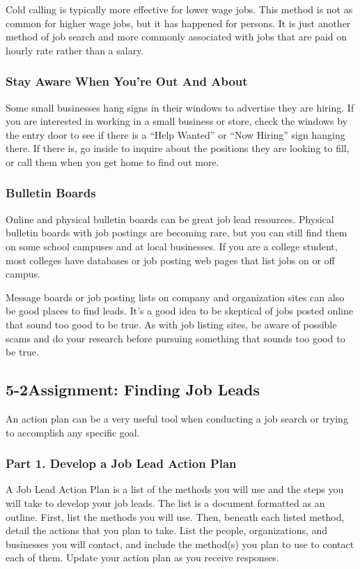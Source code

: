 Cold calling is typically more effective for lower wage jobs. This method is not as common for higher wage jobs, but it has happened for persons. It is just another method of job search and more commonly associated with jobs that are paid on hourly rate rather than a salary.

\subsubsection*{Stay Aware When You're Out And About}

Some small businesses hang signs in their windows to advertise they are hiring. If you are interested in working in a small business or store, check the windows by the entry door to see if there is a ``Help Wanted'' or ``Now Hiring'' sign hanging there. If there is, go inside to inquire about the positions they are looking to fill, or call them when you get home to find out more.

\subsubsection*{Bulletin Boards}

Online and physical bulletin boards can be great job lead resources. Physical bulletin boards with job postings are becoming rare, but you can still find them on some school campuses and at local businesses. If you are a college student, most colleges have databases or job posting web pages that list jobs on or off campus.

Message boards or job posting lists on company and organization sites can also be good places to find leads. It's a good idea to be skeptical of jobs posted online that sound too good to be true. As with job listing sites, be aware of possible scams and do your research before pursuing something that sounds too good to be true.

\pagebreak \subsection*{5-2\quad Assignment: Finding Job Leads}
An action plan can be a very useful tool when conducting a job search or trying to accomplish any specific goal.

\subsubsection*{Part 1. Develop a Job Lead Action Plan}
A Job Lead Action Plan is a list of the methods you will use and the steps you will take to develop your job leads. The list is a document formatted as an outline. First, list the methods you will use. Then, beneath each listed method, detail the actions that you plan to take. List the people, organizations, and businesses you will contact, and include the method(s) you plan to use to contact each of them. Update your action plan as you receive responses.

